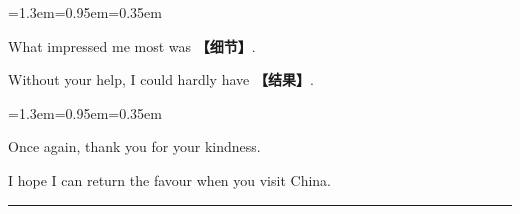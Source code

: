 \documentclass[10pt,a4paper]{ctexart}
\begin{document}
\begin{list}{}{\leftmargin=1.3em=0.95em=0.35em\itemindent=0pt\topsep=0pt\partopsep=0pt\parsep=1.5pt\itemsep=0pt}
\item[{\color{accent}\scriptsize$\blacktriangleright$}]{\footnotesize What impressed me most was {\color{accent}\bfseries 【细节】}.}\par{}
\item[{\color{accent}\scriptsize$\blacktriangleright$}]{\footnotesize Without your help, I could hardly have {\color{accent}\bfseries 【结果】}.}\par{}
\end{list}
\par\vspace{1pt}
\begin{list}{}{\leftmargin=1.3em=0.95em=0.35em\itemindent=0pt\topsep=0pt\partopsep=0pt\parsep=1.5pt\itemsep=0pt}
\item[{\color{accent}\scriptsize$\blacktriangleright$}]{\footnotesize Once again, thank you for your kindness.}\par{}
\item[{\color{accent}\scriptsize$\blacktriangleright$}]{\footnotesize I hope I can return the favour when you visit China.}\par{}
\end{list}
\par
\endgroup
\vspace{4pt}\par\nopagebreak
{\color{rule}\rule{\linewidth}{0.6pt}}\par\nopagebreak
\vspace{1pt}
\end{document}

